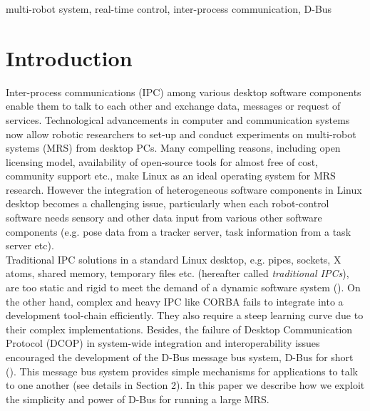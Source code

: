 \documentclass{ifacconf}
\begin{document}
\begin{frontmatter}
\begin{keyword}
multi-robot system, real-time control, inter-process communication, D-Bus
\end{keyword}

\end{frontmatter}
\section{Introduction}
Inter-process communications (IPC) among various desktop software components enable them to talk to each other and exchange data, messages or request of services. Technological advancements in computer and communication systems now allow robotic researchers to set-up and conduct experiments on multi-robot systems (MRS) from desktop PCs. Many compelling reasons, including open licensing model, availability of open-source tools for almost free of cost, community support etc., make Linux as an ideal operating system for MRS research. However the integration of heterogeneous software components in Linux desktop becomes a challenging issue, particularly when each robot-control software needs sensory and other data input from various other software components (e.g. pose data from a tracker server, task information from a task server etc).\\ 
Traditional IPC solutions in a standard Linux desktop, e.g. pipes, sockets, X atoms, shared memory, temporary files etc. (hereafter called {\em traditional IPCs}), are too static and rigid to meet the demand of a dynamic software system (\cite{wittenburg2005}). On the other hand, complex and heavy IPC like CORBA fails to integrate into a development tool-chain efficiently. They also require a steep learning curve due to their complex implementations. Besides, the failure of Desktop Communication Protocol (DCOP) in system-wide integration and interoperability issues encouraged the development of the D-Bus message bus system, D-Bus for short (\cite{Pennington+2010}). This message bus system provides simple mechanisms for applications to talk to one another (see details in Section 2). In this paper we describe  how we exploit the simplicity and power of D-Bus  for running a large MRS.\\
\end{document}
